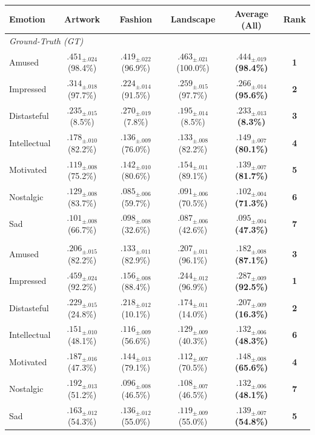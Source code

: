 \begin{tabular}{l cccc c}
\toprule
\textbf{Emotion} & \textbf{Artwork} & \textbf{Fashion} & \textbf{Landscape} & \textbf{Average (All)} & \textbf{Rank} \\
\midrule
\multicolumn{6}{l}{\textit{Ground-Truth (GT)}}\\
Amused       & $.451_{\pm .024}$ (98.4\%) & $.419_{\pm .022}$ (96.9\%) & $.463_{\pm .021}$ (100.0\%) & $\bm{.444_{\pm .019}}$ \textbf{(98.4\%)} & \textbf{1} \\
Impressed    & $.314_{\pm .018}$ (97.7\%) & $.224_{\pm .014}$ (91.5\%) & $.259_{\pm .015}$ (97.7\%) & $\bm{.266_{\pm .014}}$ \textbf{(95.6\%)} & \textbf{2} \\
Distasteful  & $.235_{\pm .015}$ (8.5\%) & $.270_{\pm .019}$ (7.8\%) & $.195_{\pm .014}$ (8.5\%) & $\bm{.233_{\pm .013}}$ \textbf{(8.3\%)} & \textbf{3} \\
Intellectual & $.178_{\pm .010}$ (82.2\%) & $.136_{\pm .009}$ (76.0\%) & $.133_{\pm .008}$ (82.2\%) & $\bm{.149_{\pm .007}}$ \textbf{(80.1\%)} & \textbf{4} \\
Motivated    & $.119_{\pm .008}$ (75.2\%) & $.142_{\pm .010}$ (80.6\%) & $.154_{\pm .011}$ (89.1\%) & $\bm{.139_{\pm .007}}$ \textbf{(81.7\%)} & \textbf{5} \\
Nostalgic    & $.129_{\pm .008}$ (83.7\%) & $.085_{\pm .006}$ (59.7\%) & $.091_{\pm .006}$ (70.5\%) & $\bm{.102_{\pm .004}}$ \textbf{(71.3\%)} & \textbf{6} \\
Sad          & $.101_{\pm .008}$ (66.7\%) & $.098_{\pm .008}$ (32.6\%) & $.087_{\pm .006}$ (42.6\%) & $\bm{.095_{\pm .004}}$ \textbf{(47.3\%)} & \textbf{7} \\
\addlinespace
\multicolumn{6}{l}{\textit{Predicted (pred)}}\\
Amused       & $.206_{\pm .015}$ (82.2\%) & $.133_{\pm .011}$ (82.9\%) & $.207_{\pm .011}$ (96.1\%) & $\bm{.182_{\pm .008}}$ \textbf{(87.1\%)} & \textbf{3} \\
Impressed    & $.459_{\pm .024}$ (92.2\%) & $.156_{\pm .008}$ (88.4\%) & $.244_{\pm .012}$ (96.9\%) & $\bm{.287_{\pm .009}}$ \textbf{(92.5\%)} & \textbf{1} \\
Distasteful  & $.229_{\pm .015}$ (24.8\%) & $.218_{\pm .012}$ (10.1\%) & $.174_{\pm .011}$ (14.0\%) & $\bm{.207_{\pm .009}}$ \textbf{(16.3\%)} & \textbf{2} \\
Intellectual & $.151_{\pm .010}$ (48.1\%) & $.116_{\pm .009}$ (56.6\%) & $.129_{\pm .009}$ (40.3\%) & $\bm{.132_{\pm .006}}$ \textbf{(48.3\%)} & \textbf{6} \\
Motivated    & $.187_{\pm .016}$ (47.3\%) & $.144_{\pm .013}$ (79.1\%) & $.112_{\pm .007}$ (70.5\%) & $\bm{.148_{\pm .008}}$ \textbf{(65.6\%)} & \textbf{4} \\
Nostalgic    & $.192_{\pm .013}$ (51.2\%) & $.096_{\pm .008}$ (46.5\%) & $.108_{\pm .007}$ (46.5\%) & $\bm{.132_{\pm .006}}$ \textbf{(48.1\%)} & \textbf{7} \\
Sad          & $.163_{\pm .012}$ (54.3\%) & $.136_{\pm .012}$ (55.0\%) & $.119_{\pm .009}$ (55.0\%) & $\bm{.139_{\pm .007}}$ \textbf{(54.8\%)} & \textbf{5} \\
\bottomrule
\end{tabular}